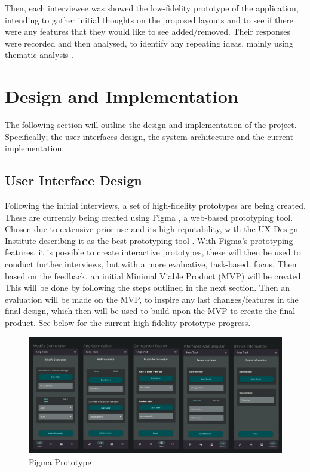 \documentclass [11pt,a4paper]{article}
\begin{document}
Then, each interviewee was showed the low-fidelity prototype of the application, intending to gather initial thoughts on the proposed layouts and to see if there were any features that they would like to see added/removed. Their responses were recorded and then analysed, to identify any repeating ideas, mainly using thematic analysis \cite{thematicAnal}.

\section{Design and Implementation}
\label{sec:design}
The following section will outline the design and implementation of the project. Specifically; the user interfaces design, the system architecture and the current implementation.

\subsection{User Interface Design}
\label{sec:ui_design}
Following the initial interviews, a set of high-fidelity prototypes are being created. These are currently being created using Figma \cite{figma}, a web-based prototyping tool. Chosen due to extensive prior use and its high reputability, with the UX Design Institute describing it as the best prototyping tool \cite{figmaUX}. With Figma's prototyping features, it is possible to create interactive prototypes, these will then be used to conduct further interviews, but with a more evaluative, task-based, focus. Then based on the feedback, an initial Minimal Viable Product (MVP) will be created. This will be done by following the steps outlined in the next section. Then an evaluation will be made on the MVP, to inspire any last changes/features in the final design, which then will be used to build upon the MVP to create the final product. See below for the current high-fidelity prototype progress.

\begin{figure}[H]
    \centering
    \includegraphics[width=1\textwidth]{images/figma_prototype.png}
    \caption{Figma Prototype}
    \label{fig:figma}
\end{figure}
\end{document}
